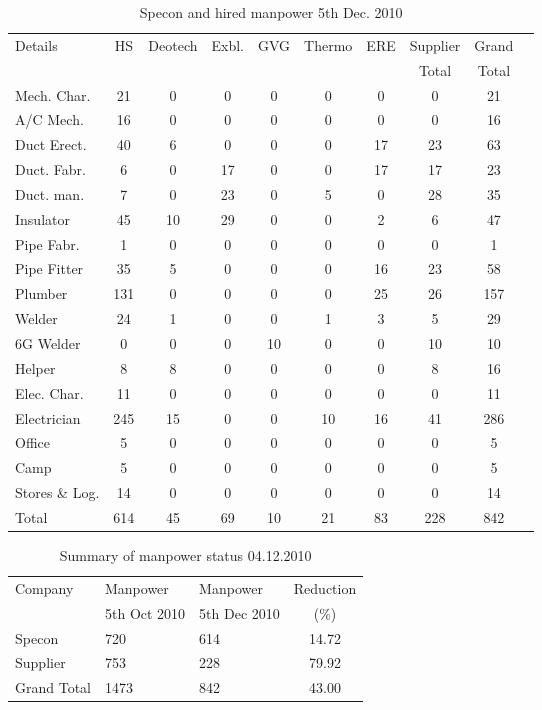 \documentclass[oneside]{tufte-book}
\begin{document}
\begin{fullwidth}
\begin{table}
\small
\hskip-1.2cm\begin{tabular}{l c c c c c c c  c c}
\toprule
Details & HS & Deotech  & Exbl. & GVG & Thermo & ERE & Supplier & Grand\\
~       &    &          		   &          &     &        &     & Total &  Total\\
\midrule
Mech. Char. & 21 & 0 &  0 & 0 & 0 & 0 &0   &21\\
A/C Mech.   & 16 & 0 &  0 & 0 & 0 & 0 &0   &16\\
Duct Erect. & 40 & 6 &  0 & 0 & 0  &17 &23  &63\\
Duct. Fabr. & 6  & 0 &  17 & 0 & 0  &17 &17  &23\\
Duct. man.  & 7  & 0 &  23 & 0 & 5  &0 &28  &35\\
Insulator   & 45  & 10  & 29  & 0 & 0  &2 &6   &47\\
Pipe Fabr.  & 1  & 0  & 0  & 0 & 0  &0 &0   &1\\
Pipe Fitter  & 35  & 5  & 0  & 0 & 0  &16 &23   &58\\
Plumber     & 131  & 0  & 0  & 0 & 0  &25 &26   &157\\
Welder      & 24  & 1  & 0  & 0 & 1  &3 &5   &29\\
6G Welder   & 0  & 0  & 0  & 10 & 0  &0 &10   &10\\
Helper      & 8  & 8  & 0  & 0 & 0  &0 &8   &16\\
\midrule
Elec. Char. & 11  & 0  & 0  & 0 & 0  &0 &0   &11\\
Electrician & 245  & 15  & 0  & 0 & 10  &16 &41   &286\\
\midrule
Office      & 5  & 0  & 0  & 0 & 0  &0 &0   &5\\
Camp        & 5  & 0  & 0  & 0 & 0  &0 &0   &5\\
Stores \& Log. & 14  & 0  & 0  & 0 & 0  &0 &0   &14\\
\midrule
Total      & 614  & 45  & 69 &10 &21 &83 &228  &842\\
\bottomrule
\end{tabular}
\caption{Specon and hired manpower 5th Dec. 2010}
\label{manpower1}
\end{table}
\end{fullwidth}
\bigskip


\begin{table}[htbp]
\begin{center}
\begin{tabular}{l l l c}
\toprule
Company     & Manpower & Manpower & Reduction\\
            & 5th Oct 2010 & 5th Dec 2010     & (\%)\\
\midrule
Specon      & 720   & 614  & 14.72\\
Supplier    & 753   & 228  & 79.92\\
\midrule  
Grand Total & 1473   & 842 & 43.00 \\ 
\bottomrule
\end{tabular}
\end{center}
\caption{Summary of manpower status 04.12.2010 }
\label{manpower2}
\end{table}
\end{document}
